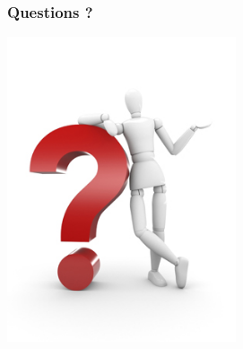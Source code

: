 \documentclass{beamer}
\begin{document}
    
    \begin{frame}
        \frametitle{Questions ?}
        \centering
        \includegraphics[height=9cm]{questions}
    \end{frame}
\end{document}

